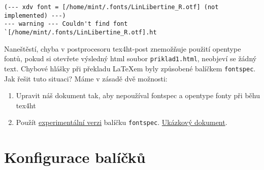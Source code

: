 \documentclass{article}
\begin{document}
\begin{verbatim}
(--- xdv font = [/home/mint/.fonts/LinLibertine_R.otf] (not implemented) ---)
--- warning --- Couldn't find font `[/home/mint/.fonts/LinLibertine_R.otf].ht
\end{verbatim}

Naneštěstí, chyba v postprocesoru \gls{tex4ht-post} znemožňuje použití opentype fontů, pokud si otevřete výsledný html soubor \verb|priklad1.html|, neobjeví se žádný text. Chybové hlášky při překladu \LaTeX em byly 
způsobené balíčkem \verb|fontspec|.  Jak řešit tuto situaci? Máme v zásadě dvě možnosti:

\begin{enumerate}
	\item Upravit náš dokument tak, aby nepoužíval fontspec a opentype fonty
		při běhu \gls{tex4ht}
	\item Použít \href{https://github.com/michal-h21/fontspec}{experimentální verzi} 
		balíčku \verb|fontspec|. 
		\href{http://michal-h21.github.io/fontspec/fontspec-4ht.html}%
		{Ukázkový dokument}.
\end{enumerate}
\section{Konfigurace balíčků}\label{sec:config}

\printglossary
\printbibliography
\end{document}

